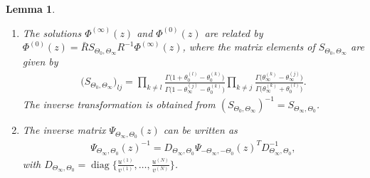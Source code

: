 \documentclass[pdftex]{sigma}
\numberwithin{equation}{section}
\newtheorem{Lemma}[Theorem]{Lemma}
\begin{document}
\begin{Lemma}
\begin{enumerate}
\item[$3.$] The solutions $\Phi^{(\infty)}(z)$ and $\Phi^{(0)}(z)$ are related by $\Phi^{(0)}(z)=\bar R S_{\Theta_0,\Theta_\infty} R^{-1}\Phi^{(\infty)}(z)$, where the matrix elements of $S_{\Theta_0,\Theta_\infty}$ are given by
\begin{gather*}
\big( S_{\Theta_0,\Theta_\infty}\big)_{lj}=
\prod_{k\ne l} \frac{\Gamma\big( 1+\theta^{(l)}_0-\theta^{(k)}_0\big)}{\Gamma\big(1 - \theta^{(j)}_\infty -\theta^{(k)}_0 \big)}
\prod_{k\ne j} \frac{\Gamma\big( \theta^{(k)}_\infty-\theta^{(j)}_\infty \big)}{\Gamma\big(\theta^{(k)}_\infty+\theta^{(l)}_0 \big)}.
\end{gather*}
The inverse transformation is obtained from $(S_{\Theta_0,\Theta_\infty})^{-1}=S_{\Theta_\infty,\Theta_0}$.
\item[$4.$] The inverse matrix $\Psi_{\Theta_{\infty},\Theta_0}(z)$ can be written as
\begin{gather}\label{invps}
\Psi_{\Theta_{\infty},\Theta_0}(z)^{-1}=D_{\Theta_{\infty},\Theta_0}\Psi_{-\Theta_{\infty},-\Theta_0}(z)^T D_{\Theta_{\infty},\Theta_0}^{-1},
\end{gather}
with $D_{\Theta_{\infty},\Theta_0}=\operatorname{diag}\big\{\frac{u^{(1)}}{v^{(1)}},\ldots,\frac{u^{(N)}}{v^{(N)}}\big\}$.
\end{enumerate}
\end{Lemma}
\end{document}
